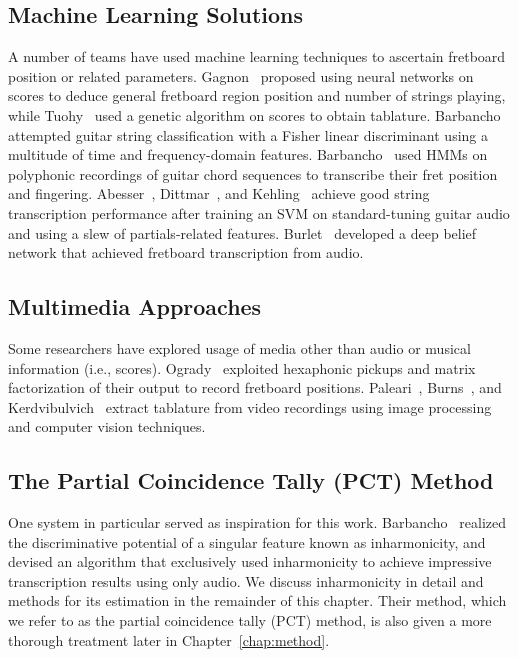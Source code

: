 \documentclass[12pt]{cmuthesis}
\begin{document}
\subsection{Machine Learning Solutions}
A number of teams have used machine learning techniques to ascertain fretboard position or related parameters. Gagnon~\cite{gagnon2003} proposed using neural networks on scores to deduce general fretboard region position and number of strings playing, while Tuohy~\cite{tuohy2006} used a genetic algorithm on scores to obtain tablature. Barbancho~\cite{barbancho2009} attempted guitar string classification with a Fisher linear discriminant using a multitude of time and frequency-domain features. Barbancho~\cite{barbanchoa2012} used HMMs on polyphonic recordings of guitar chord sequences to transcribe their fret position and fingering. Abesser~\cite{abesser2012}, Dittmar~\cite{dittmar2013}, and Kehling~\cite{kehling2014} achieve good string transcription performance after training an SVM on standard-tuning guitar audio and using a slew of partials-related features. Burlet~\cite{burlet2015} developed a deep belief network that achieved fretboard transcription from audio.

\subsection{Multimedia Approaches}
Some researchers have explored usage of media other than audio or musical information (i.e., scores). Ogrady~\cite{ogrady2009} exploited hexaphonic pickups and matrix factorization of their output to record fretboard positions. Paleari~\cite{paleari2008}, Burns~\cite{burns2006}, and Kerdvibulvich~\cite{kerd2007} extract tablature from video recordings using image processing and computer vision techniques.

\subsection{The Partial Coincidence Tally (PCT) Method}
One system in particular served as inspiration for this work. Barbancho~\cite{barbanchoi2012} realized the discriminative potential of a singular feature known as inharmonicity, and devised an algorithm that exclusively used inharmonicity to achieve impressive transcription results using only audio. We discuss inharmonicity in detail and methods for its estimation in the remainder of this chapter. Their method, which we refer to as the partial coincidence tally (PCT) method, is also given a more thorough treatment later in Chapter~\ref{chap:method}.
\end{document}
